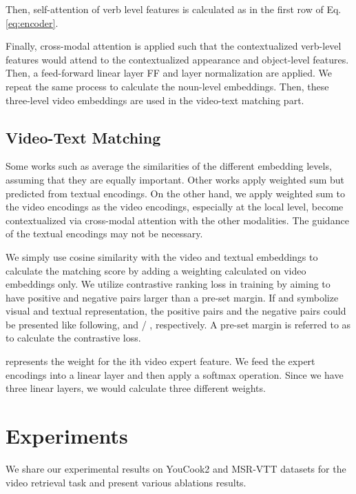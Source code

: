 \documentclass[lettersize,journal]{IEEEtran}
\begin{document}
Then, self-attention of verb level features is calculated as in the first row of Eq. \ref{eq:encoder}. 


Finally, cross-modal attention is applied such that the contextualized verb-level features would attend to the contextualized appearance and object-level features. Then, a feed-forward linear layer FF and layer normalization are applied. We repeat the same process to calculate the noun-level embeddings. Then, these three-level video embeddings are used in the video-text matching part.



\subsection{Video-Text Matching}

Some works such as \cite{Chen_2020_CVPR, satar_2021} average the similarities of the different embedding levels, assuming that they are equally important. Other works \cite{gabeur2020mmt, miech18learning} apply weighted sum but predicted from textual encodings. On the other hand, we apply weighted sum to the video encodings as the video encodings, especially at the local level, become contextualized via cross-modal attention with the other modalities. The guidance of the textual encodings may not be necessary. 

We simply use cosine similarity with the video and textual embeddings to calculate the matching score by adding a weighting calculated on video embeddings only. We utilize contrastive ranking loss  \cite{Chen_2020_CVPR} in training by aiming to have positive and negative pairs larger than a pre-set margin. If  and  symbolize visual and textual representation, the positive pairs and the negative pairs could be presented like following,  and  / , respectively. A pre-set margin is referred to as  to calculate the contrastive loss.





 represents the weight for the ith video expert feature. We feed the expert encodings into a linear layer and then apply a softmax operation. Since we have three linear layers, we would calculate three different weights. 

\section{Experiments}

We share our experimental results on YouCook2 and MSR-VTT datasets for the video retrieval task and present various ablations results. 
\end{document}
